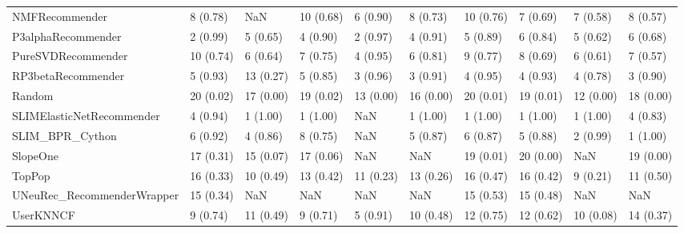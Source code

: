 \begin{tabular}{llllllllll}
                     NMFRecommender &                 8 (0.78) &         NaN &     10 (0.68) &     6 (0.90) &             8 (0.73) &           10 (0.76) &          7 (0.69) &           7 (0.58) &          8 (0.57) \\
                 P3alphaRecommender &                 2 (0.99) &    5 (0.65) &      4 (0.90) &     2 (0.97) &             4 (0.91) &            5 (0.89) &          6 (0.84) &           5 (0.62) &          6 (0.68) \\
                 PureSVDRecommender &                10 (0.74) &    6 (0.64) &      7 (0.75) &     4 (0.95) &             6 (0.81) &            9 (0.77) &          8 (0.69) &           6 (0.61) &          7 (0.57) \\
                 RP3betaRecommender &                 5 (0.93) &   13 (0.27) &      5 (0.85) &     3 (0.96) &             3 (0.91) &            4 (0.95) &          4 (0.93) &           4 (0.78) &          3 (0.90) \\
                             Random &                20 (0.02) &   17 (0.00) &     19 (0.02) &    13 (0.00) &            16 (0.00) &           20 (0.01) &         19 (0.01) &          12 (0.00) &         18 (0.00) \\
          SLIMElasticNetRecommender &                 4 (0.94) &    1 (1.00) &      1 (1.00) &          NaN &             1 (1.00) &            1 (1.00) &          1 (1.00) &           1 (1.00) &          4 (0.83) \\
                    SLIM\_BPR\_Cython &                 6 (0.92) &    4 (0.86) &      8 (0.75) &          NaN &             5 (0.87) &            6 (0.87) &          5 (0.88) &           2 (0.99) &          1 (1.00) \\
                           SlopeOne &                17 (0.31) &   15 (0.07) &     17 (0.06) &          NaN &                  NaN &           19 (0.01) &         20 (0.00) &                NaN &         19 (0.00) \\
                             TopPop &                16 (0.33) &   10 (0.49) &     13 (0.42) &    11 (0.23) &            13 (0.26) &           16 (0.47) &         16 (0.42) &           9 (0.21) &         11 (0.50) \\
         UNeuRec\_RecommenderWrapper &                15 (0.34) &         NaN &           NaN &          NaN &                  NaN &           15 (0.53) &         15 (0.48) &                NaN &               NaN \\
                          UserKNNCF &                 9 (0.74) &   11 (0.49) &      9 (0.71) &     5 (0.91) &            10 (0.48) &           12 (0.75) &         12 (0.62) &          10 (0.08) &         14 (0.37) \\
\bottomrule
\end{tabular}
